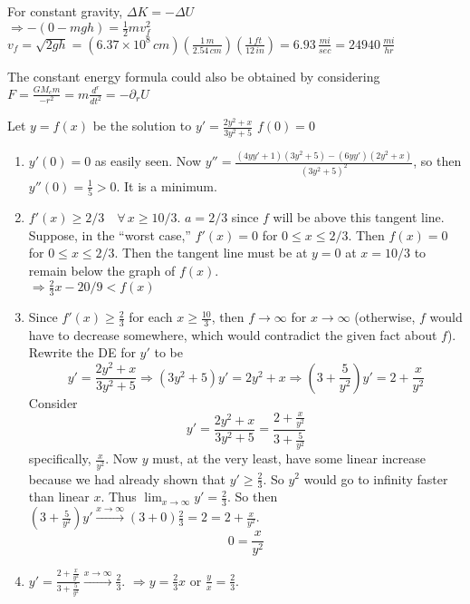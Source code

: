 \documentclass[twoside]{amsart}
\theoremstyle{plain}
\theoremstyle{definition}
\newcommand{\exercisehead}[1]
  {\smallskip
   \noindent{\small\bf Exercise #1.}}
\begin{document}
\exercisehead{29} For constant gravity, $\Delta K = - \Delta U$ \medskip \\
$\Longrightarrow - (0 - mgh) = \frac{1}{2} mv_f^2$ \medskip \\
$v_f = \sqrt{ 2 gh} = (6.37 \times 10^8 \, cm) \left( \frac{1 \, m }{ 2.54 \, cm } \right) \left( \frac{1 \, ft }{ 12 \, in } \right) = 6.93 \, \frac{ mi }{sec} = 24940 \, \frac{ mi }{ hr} $

The constant energy formula could also be obtained by considering  \medskip \\
$F = \frac{G M_e m}{ -r^2 } = m \frac{d^r }{dt^2 } = - \partial_r U$

\exercisehead{30} Let $y= f(x)$ be the solution to $y' = \frac{ 2y^2 + x }{ 3y^2 + 5 }$  $f(0)=0$
\begin{enumerate}
\item $y'(0)=0$ as easily seen.  Now $y'' = \frac{ (4yy'+1)(3y^2 + 5) - (6yy')(2y^2 + x) }{ (3y^2 + 5)^2 }$, so then \\
$y''(0) = \frac{1}{5} > 0$.  It is a minimum.  
\item $f'(x) \geq 2/3 \quad \forall \, x \geq 10/3$.  $a=2/3$ since $f$ will be above this tangent line.  \\
Suppose, in the ``worst case,'' $f'(x) = 0$ for $0 \leq x \leq 2/3$.  Then $f(x) = 0$ for $0 \leq x \leq 2/3$.  Then the tangent line must be at $y=0$ at $x=10/3$ to remain below the graph of $f(x)$.  \medskip \\
$\Longrightarrow \frac{2}{3}x - 20/9 < f(x)$
\item Since $f'(x) \geq \frac{2}{3}$ for each $x \geq \frac{10}{3}$, then $f \to \infty$ for $x \to \infty$ (otherwise, $f$ would have to decrease somewhere, which would contradict the given fact about $f$).  Rewrite the DE for $y'$ to be 
\[
y' = \frac{2y^2 + x }{ 3y^2 + 5} \Longrightarrow (3y^2 + 5 )y' = 2y^2 + x \Longrightarrow (3 + \frac{5}{y^2}) y' = 2 + \frac{x}{y^2}
\]
Consider 
\[
y' = \frac{2y^2 + x }{ 3y^2 + 5 } = \frac{ 2 + \frac{x}{y^2} }{ 3 + \frac{5}{y^2} }
\]
specifically, $\frac{x}{y^2}$.  Now $y$ must, at the very least, have some linear increase because we had already shown that $y' \geq \frac{2}{3}$.  So $y^2$ would go to infinity faster than linear $x$.  Thus $\lim_{x\to \infty} y' = \frac{2}{3}$.  So then $(3 + \frac{5}{y^2})y' \xrightarrow{ x\to \infty} (3 + 0 )\frac{2}{3} = 2 = 2 + \frac{x}{y^2}$.  
\[
\boxed{ 0 = \frac{x}{y^2} }
\]
\item $y' = \frac{2 + \frac{x}{y^2}}{ 3 + \frac{5}{y^2} } \xrightarrow{x\to \infty} \frac{2}{3}$.  $\Longrightarrow y = \frac{2}{3} x$ or $\frac{y}{x} = \frac{2}{3}$.  
\end{enumerate}
\end{document}

